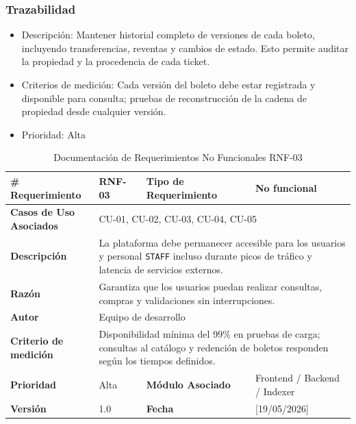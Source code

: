\documentclass[12pt,letterpaper]{article}
\begin{document}
\subsubsection{Trazabilidad}
\begin{itemize}
    \item Descripción: Mantener historial completo de versiones de cada boleto, incluyendo transferencias, reventas y cambios de estado. Esto permite auditar la propiedad y la procedencia de cada ticket.
    \item Criterios de medición: Cada versión del boleto debe estar registrada y disponible para consulta; pruebas de reconstrucción de la cadena de propiedad desde cualquier versión.
    \item Prioridad: Alta
\end{itemize}
\begin{table}[H]
\centering
\scriptsize
\renewcommand{\arraystretch}{1.2}
\setlength{\tabcolsep}{4pt}

\begin{tabularx}{\textwidth}{|p{3cm}|X|p{3.2cm}|X|}
\hline
\textbf{\# Requerimiento} & RNF-03 & \textbf{Tipo de Requerimiento} & No funcional \\ \hline

\textbf{Casos de Uso Asociados} & \multicolumn{3}{X|}{CU-01, CU-02, CU-03, CU-04, CU-05} \\ \hline

\textbf{Descripción} & 
\multicolumn{3}{p{\dimexpr\textwidth-6cm-12\tabcolsep-4\arrayrulewidth\relax}|}{La plataforma debe permanecer accesible para los usuarios y personal \texttt{STAFF} incluso durante picos de tráfico y latencia de servicios externos.} \\ \hline

\textbf{Razón} & 
\multicolumn{3}{p{\dimexpr\textwidth-6cm-12\tabcolsep-4\arrayrulewidth\relax}|}{Garantiza que los usuarios puedan realizar consultas, compras y validaciones sin interrupciones.} \\ \hline

\textbf{Autor} & \multicolumn{3}{X|}{Equipo de desarrollo} \\ \hline

\textbf{Criterio de medición} & 
\multicolumn{3}{p{\dimexpr\textwidth-6cm-12\tabcolsep-4\arrayrulewidth\relax}|}{Disponibilidad mínima del 99\% en pruebas de carga; consultas al catálogo y redención de boletos responden según los tiempos definidos.} \\ \hline

\textbf{Prioridad} & Alta & \textbf{Módulo Asociado} & Frontend / Backend / Indexer \\ \hline

\textbf{Versión} & 1.0 & \textbf{Fecha} & [19/05/2026] \\ \hline

\end{tabularx}

\caption{Documentación de Requerimientos No Funcionales RNF-03}
\label{tab:documentacion_rnf03}
\normalsize
\end{table}
\end{document}
